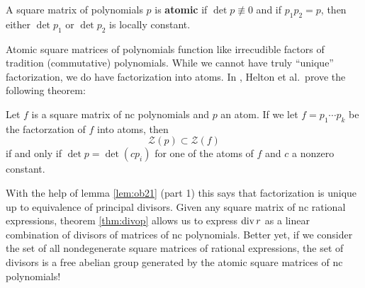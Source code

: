 \begin{definition}[Atomic]%
\label{def:atomic}
  A square matrix of polynomials \(p\) is \textbf{atomic} if
  \(\det p \not\equiv 0\) and if \(p_1p_2=p\), then either \(\det p_1\) or
  \(\det p_2\) is locally constant.
\end{definition}

Atomic square matrices of polynomials function like irrecudible factors of
tradition (commutative) polynomials. While we cannot have truly ``unique''
factorization, we do have factorization into atoms. In
\cite{heltonFactorization2019}, Helton et al.\ prove the following theorem:

\begin{theorem}
  Let \(f\) is a square matrix of nc polynomials and \(p\) an atom. If we let
  \(f = p_1 \cdots p_k\) be the factorzation of \(f\) into atoms, then
  \[
    \mathscr{Z}(p) \subset \mathscr{Z}(f)
  \]
  if and only if \(\det p = \det (c p_i)\) for one of the atoms of \(f\) and
  \(c\) a nonzero constant.
\end{theorem}

With the help of lemma \ref{lem:ob21} (part 1) this says that factorization is
unique up to equivalence of principal divisors. Given any square matrix of nc
rational expressions, theorem \ref{thm:divop} allows us to express \(\operatorname{div} r\) as a
linear combination of divisors of matrices of nc polynomials. Better yet, if we consider
the set of all nondegenerate square matrices of rational expressions, the set of
divisors is a free abelian group generated by the atomic square matrices of nc polynomials!
